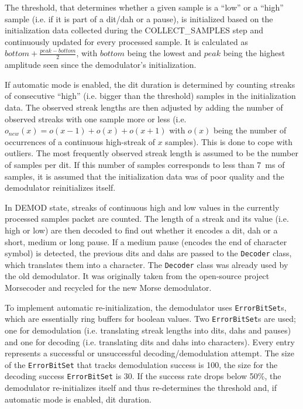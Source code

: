The threshold, that determines whether a given sample is a ``low'' or a ``high'' sample (i.e. if it is part of a dit/dah or a pause), is initialized based on the initialization data collected during the COLLECT\_{}SAMPLES step and continuously updated for every processed sample. It is calculated as $bottom + \frac{peak - bottom}{2}$, with $bottom$ being the lowest and $peak$ being the highest amplitude seen since the demodulator's initialization.

If automatic mode is enabled, the dit duration is determined by counting streaks of consecutive ``high'' (i.e. bigger than the threshold) samples in the initialization data. The observed streak lengths are then adjusted by adding the number of observed streaks with one sample more or less (i.e. $o_{new}(x) = o(x-1) + o(x)+ o(x+1)$ with $o(x)$ being the number of occurrences of a continuous high-streak of $x$ samples). This is done to cope with outliers. The most frequently observed streak length is assumed to be the number of samples per dit. If this number of samples corresponds to less than \SI{7}{\milli\second} of samples, it is assumed that the initialization data was of poor quality and the demodulator reinitializes itself.

In DEMOD state, streaks of continuous high and low values in the currently processed samples packet are counted. The length of a streak and its value (i.e. high or low) are then decoded to find out whether it encodes a dit, dah or a short, medium or long pause. If a medium pause (encodes the end of character symbol) is detected, the previous dits and dahs are passed to the \texttt{Decoder} class, which translates them into a character. The \texttt{Decoder} class was already used by the old demodulator. It was originally taken from the open-source project Morsecoder and recycled for the new Morse demodulator.

To implement automatic re-initialization, the demodulator uses \texttt{Er\-ror\-Bit\-Set}s, which are essentially ring buffers for boolean values. Two \texttt{Er\-ror\-Bit\-Set}s are used; one for demodulation (i.e. translating streak lengths into dits, dahs and pauses) and one for decoding (i.e. translating dits and dahs into characters). Every entry represents a successful or unsuccessful decoding/demodulation attempt. The size of the \texttt{Er\-ror\-Bit\-Set} that tracks demodulation success is 100, the size for the decoding success \texttt{Er\-ror\-Bit\-Set} is 30. If the success rate drops below 50\%, the demodulator re-initializes itself and thus re-determines the threshold and, if automatic mode is enabled, dit duration.


